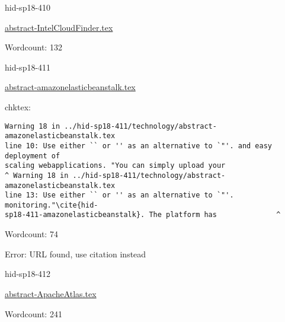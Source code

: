 

\begin{IU}

hid-sp18-410

\href{https://github.com/cloudmesh-community/hid-sp18-410/blob/master//technology/abstract-IntelCloudFinder.tex}{abstract-IntelCloudFinder.tex}

 

Wordcount: 132

\end{IU}



\begin{IU}

hid-sp18-411

\href{https://github.com/cloudmesh-community/hid-sp18-411/blob/master//technology/abstract-amazonelasticbeanstalk.tex}{abstract-amazonelasticbeanstalk.tex}

 
chktex:
\begin{tiny}
\begin{verbatim}
Warning 18 in ../hid-sp18-411/technology/abstract-amazonelasticbeanstalk.tex
line 10: Use either `` or '' as an alternative to `"'. and easy deployment of
scaling webapplications. "You can simply upload your
^ Warning 18 in ../hid-sp18-411/technology/abstract-amazonelasticbeanstalk.tex
line 13: Use either `` or '' as an alternative to `"'. monitoring."\cite{hid-
sp18-411-amazonelasticbeanstalk}. The platform has              ^
\end{verbatim}
\end{tiny}

Wordcount: 74

Error: URL found, use citation instead
\end{IU}



\begin{IU}

hid-sp18-412

\href{https://github.com/cloudmesh-community/hid-sp18-412/blob/master//technology/abstract-ApacheAtlas.tex}{abstract-ApacheAtlas.tex}

 

Wordcount: 241

\end{IU}



